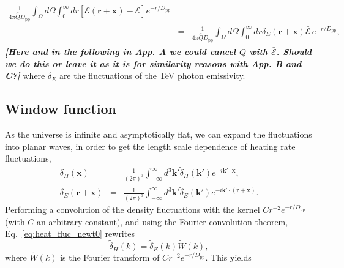 \documentclass[numberedappendix]{emulateapj}
\newcommand\Pc[1]{{\color{cyan} \bf #1}} %
\newcommand\Cc[1]{{\color{blue} \bf #1}} %
\begin{document}
{\begin{eqnarray}
  \frac{1}{4\pi\bar{\dot{Q}}D_{\mathrm{pp}}} \int_{\Omega}d\Omega\int_0^{\infty} dr 
  [\mathcal{E}(\mathbf{r}+\mathbf{x})-\bar{\mathcal{E}}]e^{-r/D_{\mathrm{pp}}} \nonumber\\
  &=&\frac{1}{4\pi\bar{\dot{Q}}D_{\mathrm{pp}}}\int_{\Omega}d\Omega\int_0^{\infty} dr \delta_E(\mathbf{r}+\mathbf{x})\bar{\mathcal{E}}\,e^{-r/D_{\mathrm{pp}}} ,
\end{eqnarray}
\Cc{{\em [Here and in the following in App. A we could cancel $\bar{\dot{Q}}$ with $\bar{\mathcal{E}}$. Should we do this or leave it as it is for similarity reasons with App. B and C?]}}
where $\delta_E$ are the fluctuations of the TeV photon emissivity. %



% 

\subsection{Window function}
As the universe is infinite and asymptotically flat, we can expand the fluctuations into planar waves, in order to get the length scale dependence of heating rate fluctuations,
\begin{eqnarray}
  \label{eq:FT_delta}
  \delta_H(\mathbf{x})&=&\frac{1}{(2\pi)^3}\int_{-\infty}^{\infty} d^3\mathbf{k'} \tilde{\delta}_H(\mathbf{k'}) e^{-i\mathbf{k'}\cdot\mathbf{x}},\\ \nonumber
  \delta_E(\mathbf{r}+\mathbf{x})&=&\frac{1}{(2\pi)^3}\int_{-\infty}^{\infty} d^3\mathbf{k'} \tilde{\delta}_E(\mathbf{k'}) e^{-i\mathbf{k'}\cdot(\mathbf{r}+\mathbf{x})}.
\end{eqnarray}
Performing a convolution of the density fluctuations with the kernel $C r^{-2} e^{-r/D_{\mathrm{pp}}}$ (with $C$ an arbitrary constant), and using the Fourier convolution theorem, Eq.~\eqref{eq:heat_fluc_newt0} rewrites
\begin{equation}
   \label{eq:1}
\tilde{\delta}_H(k) = \tilde{\delta}_E(k) \tilde{W}(k),
 \end{equation}
where $\tilde{W}(k)$ is the Fourier transform of $C r^{-2} e^{-r/D_{\mathrm{pp}}}$. This yields


}
\end{document}
